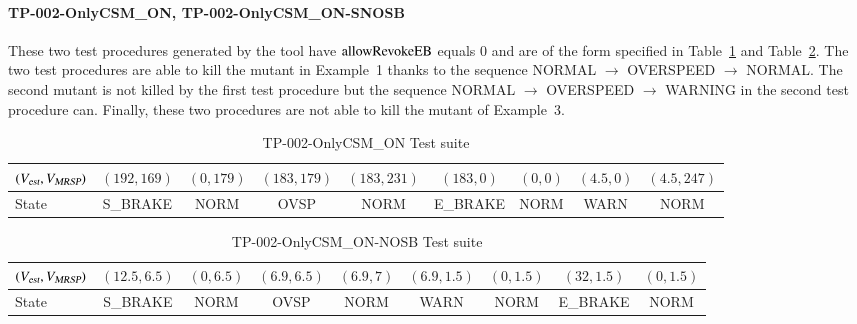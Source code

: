 
\paragraph{TP-002-OnlyCSM\_ON, TP-002-OnlyCSM\_ON-SNOSB}
  These two
test procedures generated by the tool have $\text{allowRevokeEB}$ equals 0 and are of the
  form specified in Table~\ref{tab:tp002discuss} and Table~\ref{tab:tp002discussb}.
  The two test procedures are able to kill the mutant in Example~1 thanks
to the sequence {\footnotesize NORMAL $\rightarrow$ OVERSPEED
$\rightarrow$  NORMAL}. The second mutant is not killed by the first
test procedure but the sequence  {\footnotesize NORMAL $\rightarrow$ OVERSPEED
$\rightarrow$  WARNING} in the second test procedure can. Finally,
these two procedures are not able to kill the mutant of Example~3.

\begin{table}[htbp]
\caption{TP-002-OnlyCSM\_ON Test suite}
\footnotesize
\noindent\begin{tabular}{|l|cccccccc|}\hline
$({V_{\text{\sl est}}},{V_{\text{\sl MRSP}}})$ & $(192,169)$  & $ (0,179)$ & $ (183,179)$ & $ (183,231)$ & $ (183,0)$ & $ (0,0)$ & $ (4.5,0)$ & $ (4.5,247)$
\\\hline
State & \tiny{S\_BRAKE} &  \tiny{NORM} &\tiny{OVSP} & \tiny{NORM} & \tiny{E\_BRAKE} & \tiny{NORM} & \tiny{WARN} & \tiny{NORM} \\\hline
\end{tabular}
\normalsize
\label{tab:tp002discuss}
\end{table}

\begin{table}[htbp]
\caption{TP-002-OnlyCSM\_ON-NOSB Test suite}
\footnotesize
\noindent\begin{tabular}{|l|cccccccc|}\hline
$({V_{\text{\sl est}}},{V_{\text{\sl MRSP}}})$ & $(12.5,6.5)$  & $ (0,6.5)$ & $ (6.9,6.5)$ & $ (6.9,7)$ & $ (6.9,1.5)$ & $ (0,1.5)$ & $ (32,1.5)$ & $ (0,1.5)$
\\\hline
State & \tiny{S\_BRAKE} &  \tiny{NORM} &\tiny{OVSP} & \tiny{NORM} & \tiny{WARN} & \tiny{NORM} & \tiny{E\_BRAKE} & \tiny{NORM} \\\hline
\end{tabular}
\label{tab:tp002discussb}
\normalsize
\end{table}



